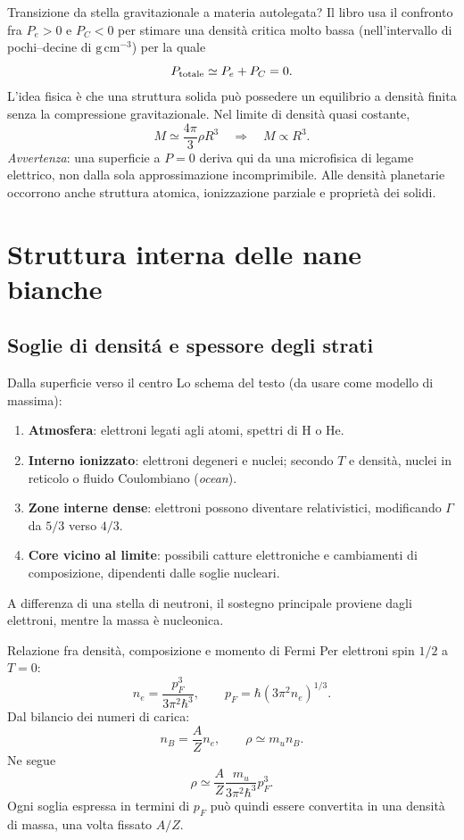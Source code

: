 \begin{frame}[t]{Transizione da stella gravitazionale a materia autolegata?}
\small
Il libro usa il confronto fra $P_e>0$ e $P_C<0$ per stimare una densità critica molto bassa (nell'intervallo di pochi--decine di $\mathrm{g\,cm^{-3}}$) per la quale
\[
P_{\rm totale}\simeq P_e+P_C=0.
\]
L'idea fisica è che una struttura solida può possedere un equilibrio a densità finita senza la compressione gravitazionale.
\medskip
Nel limite di densità quasi costante,
\[
M\simeq\frac{4\pi}3\rho R^3
\quad\Longrightarrow\quad M\propto R^3.
\]
\emph{Avvertenza}: una superficie a $P=0$ deriva qui da una microfisica di legame elettrico, non dalla sola approssimazione incomprimibile. Alle densità planetarie occorrono anche struttura atomica, ionizzazione parziale e proprietà dei solidi.
\end{frame}

\section{Struttura interna delle nane bianche}

\subsection{Soglie di densit\'a e spessore degli strati}\label{ssec:WDstructuredensityth}

\begin{frame}[t]{Dalla superficie verso il centro}
\small
Lo schema del testo (da usare come modello di massima):
\begin{enumerate}
\item \textbf{Atmosfera}: elettroni legati agli atomi, spettri di H o He.
\item \textbf{Interno ionizzato}: elettroni degeneri e nuclei; secondo $T$ e densità, nuclei in reticolo o fluido Coulombiano (\emph{ocean}).
\item \textbf{Zone interne dense}: elettroni possono diventare relativistici, modificando $\Gamma$ da $5/3$ verso $4/3$.
\item \textbf{Core vicino al limite}: possibili catture elettroniche e cambiamenti di composizione, dipendenti dalle soglie nucleari.
\end{enumerate}
A differenza di una stella di neutroni, il sostegno principale proviene dagli elettroni, mentre la massa è nucleonica.
\end{frame}

\begin{frame}[t]{Relazione fra densità, composizione e momento di Fermi}
\small
Per elettroni spin $1/2$ a $T=0$:
\[
n_e=\frac{p_F^3}{3\pi^2\hbar^3},\qquad
p_F=\hbar(3\pi^2n_e)^{1/3}.
\]
Dal bilancio dei numeri di carica:
\[
n_B=\frac AZn_e,\qquad \rho\simeq m_u n_B.
\]
Ne segue
\[
\rho\simeq\frac AZ\frac{m_u}{3\pi^2\hbar^3}p_F^3.
\]
Ogni soglia espressa in termini di $p_F$ può quindi essere convertita in una densità di massa, una volta fissato $A/Z$.
\end{frame}

